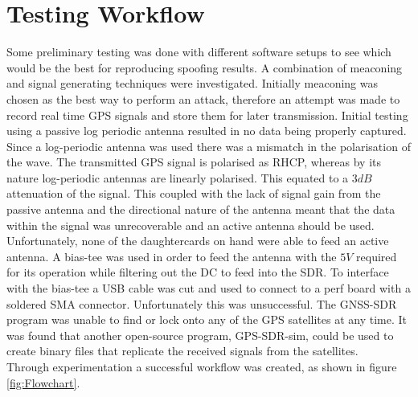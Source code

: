 
\section{Testing Workflow}

Some preliminary testing was done with different software setups to see which would be the best for reproducing spoofing results. A combination of meaconing and signal
generating techniques were investigated. Initially meaconing was chosen as the best way to perform an attack, therefore an attempt was made to record real time GPS signals
and store them for later transmission. Initial testing using a passive log periodic antenna resulted in no data being properly captured. Since a log-periodic antenna was
used there was a mismatch in the polarisation of the wave. The transmitted GPS signal is polarised as RHCP, whereas by its nature log-periodic antennas are linearly
polarised. This equated to a $3dB$ attenuation of the signal. This coupled with the lack of signal gain from the passive antenna and the directional nature of the antenna
meant that the data within the signal was unrecoverable and an active antenna should be used. Unfortunately, none of the daughtercards on hand were able to feed an active
antenna. A bias-tee was used in order to feed the antenna with the $5V$ required for its operation while filtering out the DC to feed into the SDR. To interface with the
bias-tee a USB cable was cut and used to connect to a perf board with a soldered SMA connector. Unfortunately this was unsuccessful. The GNSS-SDR program was unable to
find or lock onto any of the GPS satellites at any time. It was found that another open-source program, GPS-SDR-sim, could be used to create binary files that replicate
the received signals from the satellites. 
\\Through experimentation a successful workflow was created, as shown in figure \ref{fig:Flowchart}.

